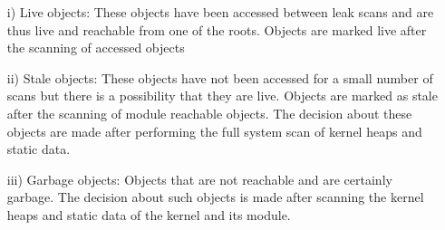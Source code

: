 \begin{enumerate}
   \item[i)] Live objects: These objects have been accessed between leak scans and are thus live and reachable from one of the roots. Objects are marked live after the scanning of accessed objects
   \item[ii)] Stale objects: These objects have not been accessed for a small number of scans but there is a possibility that they are live. Objects are marked as stale after the scanning of module reachable objects. The decision about these objects are made after performing the full system scan of kernel heaps and static data.
   \item[iii)] Garbage objects: Objects that are not reachable and are certainly garbage. The decision about such objects is made after scanning the kernel heaps and static data of the kernel and its module. 


\end{enumerate}

